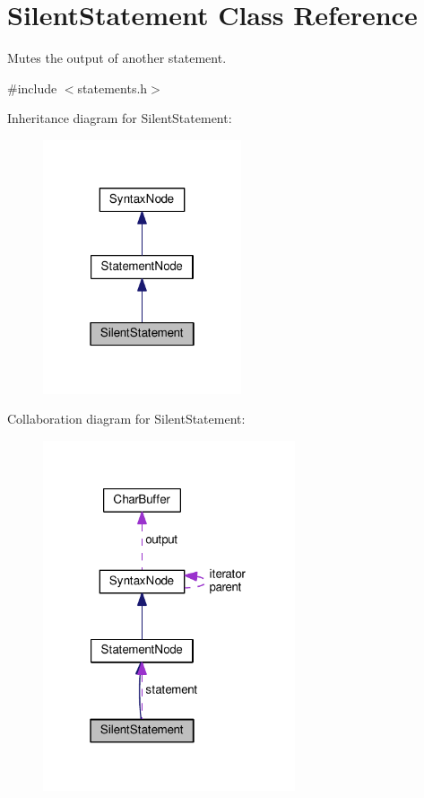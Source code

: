\hypertarget{classSilentStatement}{}\section{Silent\+Statement Class Reference}
\label{classSilentStatement}


Mutes the output of another statement.  




{\ttfamily \#include $<$statements.\+h$>$}



Inheritance diagram for Silent\+Statement\+:\nopagebreak
\begin{figure}[H]
\begin{center}
\leavevmode
\includegraphics[width=166pt]{classSilentStatement__inherit__graph}
\end{center}
\end{figure}


Collaboration diagram for Silent\+Statement\+:\nopagebreak
\begin{figure}[H]
\begin{center}
\leavevmode
\includegraphics[width=211pt]{classSilentStatement__coll__graph}
\end{center}
\end{figure}
